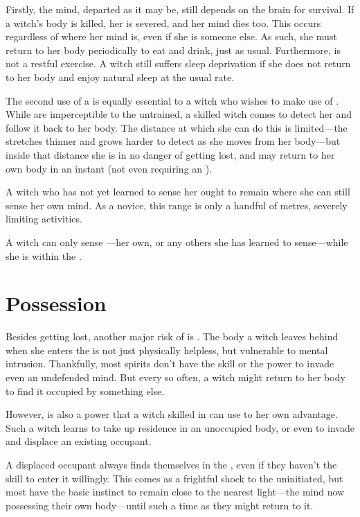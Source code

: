 Firstly, the mind, departed as it may be, still depends on the brain for survival.
If a witch's body is killed, her {\lifeline} is severed, and her mind dies too.
This occurs regardless of where her mind is, even if she is {\possessing} someone else.
As such, she must return to her body periodically to eat and drink, just as usual.
Furthermore,  is not a restful exercise.
A witch still suffers sleep deprivation if she does not return to her body and enjoy natural sleep at the usual rate.

The second use of a {\lifeline} is equally essential to a witch who wishes to make use of .
While {\lifelines} are imperceptible to the untrained, a skilled witch comes to detect her {\lifeline} and follow it back to her body.
The distance at which she can do this is limited---the {\lifeline} stretches thinner and grows harder to detect as she moves from her body---but inside that distance she is in no danger of getting lost, and may return to her own body in an instant (not even requiring an {\action}).

A witch who has not yet learned to sense her {\lifeline} ought to remain where she can still sense her own mind.
As a novice, this range is only a handful of metres, severely limiting activities.

A witch can only sense {\lifelines}---her own, or any others she has learned to sense---while she is within the {\mentalrealm}.

\section{Possession}

Besides getting lost, another major risk of  is {\possession}.
The body a witch leaves behind when she enters the {\mentalrealm} is not just physically helpless, but vulnerable to mental intrusion.
Thankfully, most spirits don't have the skill or the power to invade even an undefended mind.
But every so often, a witch might return to her body to find it occupied by something else.

However, {\possession} is also a power that a witch skilled in  can use to her own advantage.
Such a witch learns to take up residence in an unoccupied body, or even to invade and displace an existing occupant.

A displaced occupant always finds themselves in the {\mentalrealm}, even if they haven't the skill to enter it willingly.
This comes as a frightful shock to the uninitiated, but most have the basic instinct to remain close to the nearest light---the mind now possessing their own body---until such a time as they might return to it.


